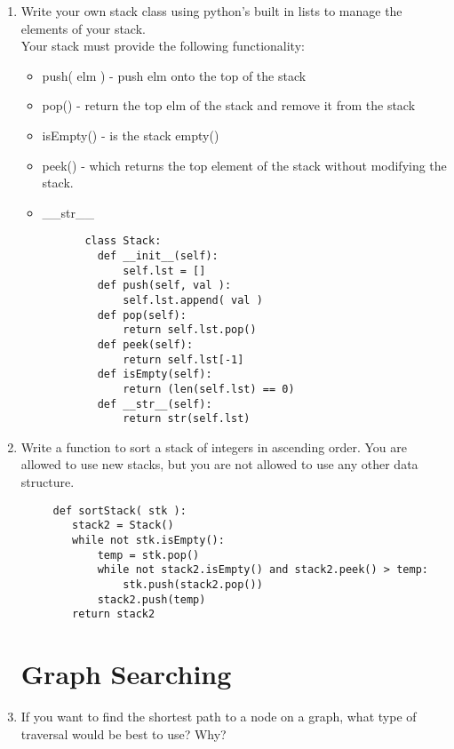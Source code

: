 \documentclass[11pt]{article}
\newenvironment{answer}{\large\lstset{basicstyle=\large}\color{white}}{}
\newenvironment{answer}{\large\lstset{basicstyle=\large}\color{red}}{}
\begin{document}
\begin{enumerate}
    \item Write your own stack class using python's built in lists to manage the elements of your stack. \\
    Your stack must provide the following functionality:
          \begin{itemize}
          \item []push( elm ) - push elm onto the top of the stack
          \item []pop() - return the top elm of the stack and remove it from the stack
          \item []isEmpty() - is the stack empty()
          \item []peek() - which returns the top element of the stack without modifying the stack. 
          \item []\_\_str\_\_
          \end{itemize}
          \begin{answer}
          \begin{lstlisting}
          class Stack:
            def __init__(self):
                self.lst = []
            def push(self, val ):
                self.lst.append( val )
            def pop(self):
                return self.lst.pop()
            def peek(self):
                return self.lst[-1]
            def isEmpty(self):
                return (len(self.lst) == 0)
            def __str__(self):
                return str(self.lst)
                  \end{lstlisting}
          \end{answer}

          \pagebreak
     \item Write a function to sort a stack of integers in ascending order. You are allowed to use new stacks,
     but you are not allowed to use any other data structure. 
     \begin{answer}
     \begin{lstlisting}
     def sortStack( stk ):
        stack2 = Stack()
        while not stk.isEmpty():
            temp = stk.pop()
            while not stack2.isEmpty() and stack2.peek() > temp:
                stk.push(stack2.pop())
            stack2.push(temp)
        return stack2 
     \end{lstlisting}
     \end{answer}

\section*{Graph Searching}
    \item If you want to find the shortest path to a node on a graph, what type
        of traversal would be best to use? Why?


\end{enumerate}
\end{document}
